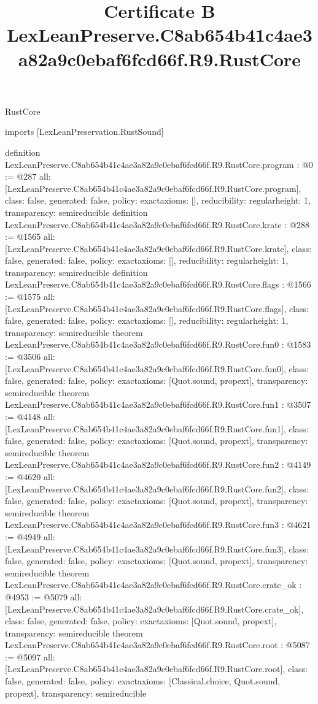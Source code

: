 \begin{lexlean}{RustCore}
\title{Certificate B LexLeanPreserve.C8ab654b41c4ae3a82a9c0ebaf6fcd66f.R9.RustCore}
\begin{coremodule}
imports [LexLeanPreservation.RustSound]

definition LexLeanPreserve.C8ab654b41c4ae3a82a9c0ebaf6fcd66f.R9.RustCore.program : @0 := @287 {
  all: [LexLeanPreserve.C8ab654b41c4ae3a82a9c0ebaf6fcd66f.R9.RustCore.program],
  class: false,
  generated: false,
  policy: exact{axioms: []},
  reducibility: regular{height: 1},
  transparency: semireducible
}
definition LexLeanPreserve.C8ab654b41c4ae3a82a9c0ebaf6fcd66f.R9.RustCore.krate : @288 := @1565 {
  all: [LexLeanPreserve.C8ab654b41c4ae3a82a9c0ebaf6fcd66f.R9.RustCore.krate],
  class: false,
  generated: false,
  policy: exact{axioms: []},
  reducibility: regular{height: 1},
  transparency: semireducible
}
definition LexLeanPreserve.C8ab654b41c4ae3a82a9c0ebaf6fcd66f.R9.RustCore.flags : @1566 := @1575 {
  all: [LexLeanPreserve.C8ab654b41c4ae3a82a9c0ebaf6fcd66f.R9.RustCore.flags],
  class: false,
  generated: false,
  policy: exact{axioms: []},
  reducibility: regular{height: 1},
  transparency: semireducible
}
theorem LexLeanPreserve.C8ab654b41c4ae3a82a9c0ebaf6fcd66f.R9.RustCore.fun0 : @1583 := @3506 {
  all: [LexLeanPreserve.C8ab654b41c4ae3a82a9c0ebaf6fcd66f.R9.RustCore.fun0],
  class: false,
  generated: false,
  policy: exact{axioms: [Quot.sound, propext]},
  transparency: semireducible
}
theorem LexLeanPreserve.C8ab654b41c4ae3a82a9c0ebaf6fcd66f.R9.RustCore.fun1 : @3507 := @4148 {
  all: [LexLeanPreserve.C8ab654b41c4ae3a82a9c0ebaf6fcd66f.R9.RustCore.fun1],
  class: false,
  generated: false,
  policy: exact{axioms: [Quot.sound, propext]},
  transparency: semireducible
}
theorem LexLeanPreserve.C8ab654b41c4ae3a82a9c0ebaf6fcd66f.R9.RustCore.fun2 : @4149 := @4620 {
  all: [LexLeanPreserve.C8ab654b41c4ae3a82a9c0ebaf6fcd66f.R9.RustCore.fun2],
  class: false,
  generated: false,
  policy: exact{axioms: [Quot.sound, propext]},
  transparency: semireducible
}
theorem LexLeanPreserve.C8ab654b41c4ae3a82a9c0ebaf6fcd66f.R9.RustCore.fun3 : @4621 := @4949 {
  all: [LexLeanPreserve.C8ab654b41c4ae3a82a9c0ebaf6fcd66f.R9.RustCore.fun3],
  class: false,
  generated: false,
  policy: exact{axioms: [Quot.sound, propext]},
  transparency: semireducible
}
theorem LexLeanPreserve.C8ab654b41c4ae3a82a9c0ebaf6fcd66f.R9.RustCore.crate_ok : @4953 := @5079 {
  all: [LexLeanPreserve.C8ab654b41c4ae3a82a9c0ebaf6fcd66f.R9.RustCore.crate_ok],
  class: false,
  generated: false,
  policy: exact{axioms: [Quot.sound, propext]},
  transparency: semireducible
}
theorem LexLeanPreserve.C8ab654b41c4ae3a82a9c0ebaf6fcd66f.R9.RustCore.root : @5087 := @5097 {
  all: [LexLeanPreserve.C8ab654b41c4ae3a82a9c0ebaf6fcd66f.R9.RustCore.root],
  class: false,
  generated: false,
  policy: exact{axioms: [Classical.choice, Quot.sound, propext]},
  transparency: semireducible
}


\end{coremodule}
\end{lexlean}
